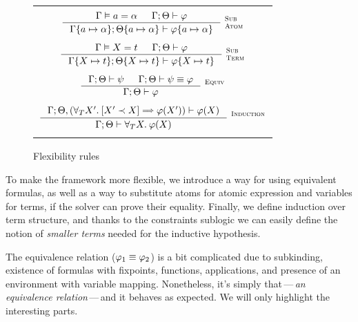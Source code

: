 \documentclass[english, mgr]{iithesis}
\renewcommand{\it}[1]{\textit{#1}}
\newcommand{\scbrk}[2]{\myatop{\textsc{#1}}{\textsc{#2}}}
\newcommand{\mdash}{\,---\,}
\def\-{{\mdash}}
\begin{document}
\begin{figure}[htbp]
\centering
\begin{tabularx}{\textwidth}{|C|}
  \hline \\
$
  \inference{
    \cjgmnt[\cEnv]{\atomv \ceq \atomexp} &
    \jgmnt[\cEnv;\Theta]{\formphi}
    }{
    \jgmnt[\cEnv\{\atomv \mapsto \atomexp\};\Theta\{\atomv \mapsto \atomexp\}]{\formphi\{\atomv \mapsto \atomexp\}}
  }\:\scbrk{Sub}{Atom}
$ \\ \\ $
  \inference{
    \cjgmnt[\cEnv]{\termv \ceq \term} &
    \jgmnt[\cEnv;\Theta]{\formphi}
    }{
    \jgmnt[\cEnv\{\termv \mapsto \term\};\Theta\{\termv \mapsto \term\}]{\formphi\{\termv \mapsto \term\}}
  }\:\scbrk{Sub}{Term}
$ \\ \\ $
  \inference{
    \jgmnt[\cEnv;\Theta]{\psi} &
    \jgmnt[\cEnv;\Theta]{\psi \equiv \formphi}
    }{
    \jgmnt[\cEnv;\Theta]{\formphi}
  }\:\scbrk{Equiv}{}
$ \\ \\ $
  \inference{
    \jgmnt[\cEnv;\Theta, (\fForallTerm{\termv'} \fCImp{\termv' \cshlt \termv} \formphi(\termv'))]{\formphi(\termv)}
    }{
    \jgmnt[\cEnv;\Theta]{\fForallTerm{\termv} \formphi(\termv)}
  }\:\scbrk{Induction}{}
  $ \\ \\ \hline
\end{tabularx}
\caption{Flexibility rules}
\label{fig:flexibility}
\end{figure}
To make the framework more flexible, we introduce a way for using equivalent formulas, as well as a way to substitute atoms for atomic expression and variables for terms, if the solver can prove their equality. Finally, we define induction over term structure,
and thanks to the constraints sublogic we can easily define the notion of
\it{smaller terms} needed for the inductive hypothesis.

The equivalence relation ($\varphi_1 \equiv \varphi_2$) is a bit complicated
due to subkinding, existence of formulas
with fixpoints, functions, applications,
and presence of an environment with variable mapping.
Nonetheless, it's simply that\-\it{an equivalence relation}\-and it
behaves as expected. We will only highlight the interesting parts.
\end{document}

